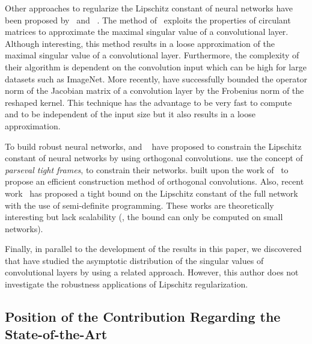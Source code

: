 Other approaches to regularize the Lipschitz constant of neural networks have been proposed by~\citet{sedghi2018singular} and ~\citet{singla2019bounding}.
The method of~\citet{sedghi2018singular} exploits the properties of circulant matrices to approximate the maximal singular value of a convolutional layer.
Although interesting, this method results in a loose approximation of the maximal singular value of a convolutional layer.
Furthermore, the complexity of their algorithm is dependent on the convolution input which can be high for large datasets such as ImageNet.
More recently, \citet{singla2019bounding} have successfully bounded the operator norm of the Jacobian matrix of a convolution layer by the Frobenius norm of the reshaped kernel.
This technique has the advantage to be very fast to compute and to be independent of the input size but it also results in a loose approximation. 

To build robust neural networks, \citet{cisse2017parseval} and ~\citet{li2019preventing} have proposed to constrain the Lipschitz constant of neural networks by using orthogonal convolutions.
\citet{cisse2017parseval} use the concept of \emph{parseval tight frames}, to constrain their networks.
\citet{li2019preventing} built upon the work of~\citet{cisse2017parseval} to propose an efficient construction method of orthogonal convolutions.  
Also, recent work~\cite{fazlyab2019efficient,latorre2020lipschitz} has proposed a tight bound on the Lipschitz constant of the full network with the use of semi-definite programming.
These works are theoretically interesting but lack scalability (\ie, the bound can only be computed on small networks).

Finally, in parallel to the development of the results in this paper, we discovered that \citet{yi2020asymptotic} have studied the asymptotic distribution of the singular values of convolutional layers by using a related approach. However, this author does not investigate the robustness applications of Lipschitz regularization.



\subsection{Position of the Contribution Regarding the State-of-the-Art}
\label{subsection:ch3-position_of_the_contribution_regarding_the_state-of-the-art_2}


